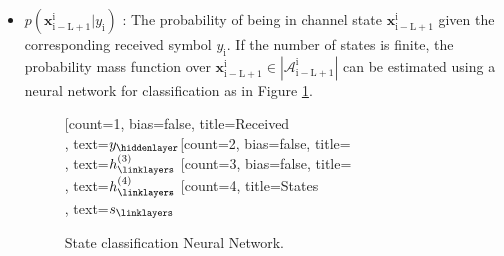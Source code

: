 \documentclass[12pt,a4paper]{report}
\begin{document}
\begin{itemize}
\item $p(\mathbf{x}_{\mathrm{i-L+1}}^{\mathrm{i}}|y_{\mathrm{i}})$
: The probability of being in channel state $\mathbf{x}_{\mathrm{i-L+1}}^{\mathrm{i}}$ given the corresponding received symbol $y_{\mathrm{i}}$. If the number of states is finite, the probability mass function over $\mathbf{x}_{\mathrm{i-L+1}}^{\mathrm{i}} \in
|\mathcal{A}_{\mathrm{i-L+1}}^{\mathrm{i}}|$ can be estimated using a neural network for classification as in Figure \ref{nn}. 
	\begin{figure}[H]
	\centering
		\begin{neuralnetwork}[height=4, nodespacing=10mm, layerspacing=15mm]
		\newcommand{\x}[2]{$y_#2$}
		\newcommand{\y}[2]{$s_#2$}
		\newcommand{\hfirst}[2]{\small $h^{(1)}_#2$}
		\newcommand{\hsecond}[2]{\small $h^{(2)}_#2$}
		\newcommand{\hthird}[2]{\small $h^{(3)}_#2$}
		\newcommand{\hfourth}[2]{\small $h^{(4)}_#2$}
		[count=1, bias=false, title=Received\\, text=\x]
		\hiddenlayer[count=2, bias=false, title=\\, text=\hthird] \linklayers
		\hiddenlayer[count=3, bias=false, title=\\, text=\hfourth] \linklayers
		\outputlayer[count=4, title=States\\, text=\y] \linklayers
	    \end{neuralnetwork}
	    	  	  \caption{State classification Neural Network.}
\label{nn}
	\end{figure}


\end{itemize}
\end{document}
